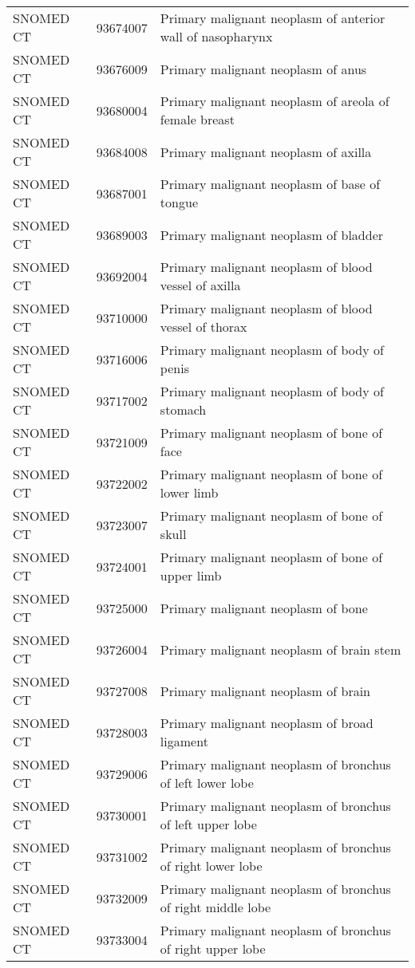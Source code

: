 \begin{longtable}{p{}p{}p{}}
  SNOMED CT & 93674007 & Primary malignant neoplasm of anterior wall of nasopharynx \\ 
  SNOMED CT & 93676009 & Primary malignant neoplasm of anus \\ 
  SNOMED CT & 93680004 & Primary malignant neoplasm of areola of female breast \\ 
  SNOMED CT & 93684008 & Primary malignant neoplasm of axilla \\ 
  SNOMED CT & 93687001 & Primary malignant neoplasm of base of tongue \\ 
  SNOMED CT & 93689003 & Primary malignant neoplasm of bladder \\ 
  SNOMED CT & 93692004 & Primary malignant neoplasm of blood vessel of axilla \\ 
  SNOMED CT & 93710000 & Primary malignant neoplasm of blood vessel of thorax \\ 
  SNOMED CT & 93716006 & Primary malignant neoplasm of body of penis \\ 
  SNOMED CT & 93717002 & Primary malignant neoplasm of body of stomach \\ 
  SNOMED CT & 93721009 & Primary malignant neoplasm of bone of face \\ 
  SNOMED CT & 93722002 & Primary malignant neoplasm of bone of lower limb \\ 
  SNOMED CT & 93723007 & Primary malignant neoplasm of bone of skull \\ 
  SNOMED CT & 93724001 & Primary malignant neoplasm of bone of upper limb \\ 
  SNOMED CT & 93725000 & Primary malignant neoplasm of bone \\ 
  SNOMED CT & 93726004 & Primary malignant neoplasm of brain stem \\ 
  SNOMED CT & 93727008 & Primary malignant neoplasm of brain \\ 
  SNOMED CT & 93728003 & Primary malignant neoplasm of broad ligament \\ 
  SNOMED CT & 93729006 & Primary malignant neoplasm of bronchus of left lower lobe \\ 
  SNOMED CT & 93730001 & Primary malignant neoplasm of bronchus of left upper lobe \\ 
  SNOMED CT & 93731002 & Primary malignant neoplasm of bronchus of right lower lobe \\ 
  SNOMED CT & 93732009 & Primary malignant neoplasm of bronchus of right middle lobe \\ 
  SNOMED CT & 93733004 & Primary malignant neoplasm of bronchus of right upper lobe \\ 

\end{longtable}
